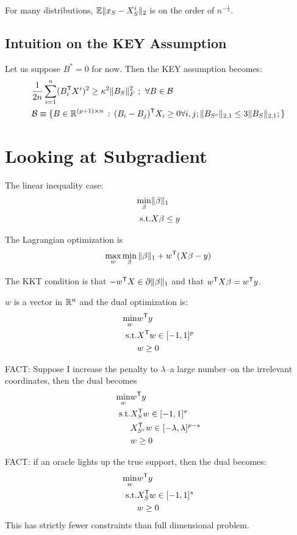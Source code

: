 \documentclass{article}
\begin{document}
For many distributions, $\mathbb{E}\| x_S - X^i_S \|_2$ is on the order of $n^{- \frac{1}{s}}$.

\subsection{Intuition on the KEY Assumption}

Let us suppose $B^* = 0$ for now. Then the KEY assumption becomes:
\begin{align*}
 & \frac{1}{2n} \sum_{i=1}^n (B_i^{\mathsf{T}} X^i)^2 \geq \kappa^2 \|B_S \|_F^2 \,\,;\:\,\forall B \in \mathcal{B} \\ 
			& \mathcal{B} \equiv \{ B \in \mathbb{R}^{(p+1) \times n} \,:\, (B_i - B_j)^{\mathsf{T}} X_i \geq 0\forall i,j ; \|B_{S^c}\|_{2,1} \leq 3 \| B_S \|_{2,1} ; \}
\end{align*}

\section{Looking at Subgradient}

The linear inequality case:
\begin{align*}
\min_{\beta}  & \|\beta\|_1 \\
\textrm{s.t.} & X\beta \leq y
\end{align*}

The Lagrangian optimization is
\[
\max_w \min_\beta \|\beta\|_1 + w^{\mathsf{T}} (X\beta - y) 
\]

The KKT condition is that $- w^{\mathsf{T}} X \in \partial \|\beta\|_1$ and that $w^{\mathsf{T}} X\beta = w^{\mathsf{T}} y$.

$w$ is a vector in $\mathbb{R}^n$ and the dual optimization is:
\begin{align*}
\min_w & w^{\mathsf{T}} y \\
\textrm{s.t.} & X^{\mathsf{T}} w \in [-1,1]^p \\
&	w \geq 0
\end{align*}

FACT: Suppose I increase the penalty to $\lambda$--a large number--on the irrelevant coordinates, then the dual becomes
\begin{align*}
\min_w & w^{\mathsf{T}} y \\
\textrm{s.t.} & X_S^{\mathsf{T}} w \in [-1,1]^s \\
& X_{S^c}^{\mathsf{T}} w \in [-\lambda, \lambda]^{p-s} \\
&	w \geq 0
\end{align*}

FACT: if an oracle lights up the true support, then the dual becomes:
\begin{align*}
\min_w & w^{\mathsf{T}} y \\
\textrm{s.t.} & X_S^{\mathsf{T}} w \in [-1,1]^s\\
& w \geq 0
\end{align*}
This has strictly fewer constraints than full dimensional problem.
\end{document}
